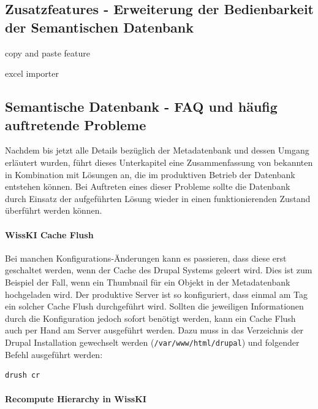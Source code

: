 \subsection{Zusatzfeatures - Erweiterung der Bedienbarkeit der Semantischen Datenbank}\label{sec:additional_features}

copy and paste feature

excel importer

\subsection{Semantische Datenbank - FAQ und häufig auftretende Probleme}\label{sec:faqSW}

Nachdem bis jetzt alle Details bezüglich der Metadatenbank und dessen Umgang erläutert wurden, führt dieses Unterkapitel eine Zusammenfassung von bekannten  in Kombination mit Lösungen an, die im produktiven Betrieb der Datenbank entstehen können. Bei Auftreten eines dieser Probleme sollte die Datenbank durch Einsatz der aufgeführten Lösung wieder in einen funktionierenden Zustand überführt werden können.

\paragraph{WissKI Cache Flush}

Bei manchen Konfigurations-Änderungen kann es passieren, dass diese erst  geschaltet werden, wenn der Cache des Drupal Systems geleert wird. Dies ist zum Beispiel der Fall, wenn ein Thumbnail für ein Objekt in der Metadatenbank hochgeladen wird. Der produktive Server ist so konfiguriert, dass einmal am Tag ein solcher Cache Flush durchgeführt wird. Sollten die jeweiligen Informationen durch die Konfiguration jedoch sofort benötigt werden, kann ein Cache Flush auch per Hand am Server ausgeführt werden. Dazu muss in das Verzeichnis der Drupal Installation gewechselt werden (\texttt{/var/www/html/drupal}) und folgender Befehl ausgeführt werden:

\begin{lstlisting}[style=MyBashStyle, caption={Befehl für einen Cache Flush eines Drupal Systems.}]
drush cr 
\end{lstlisting}

\paragraph{Recompute Hierarchy in WissKI}

